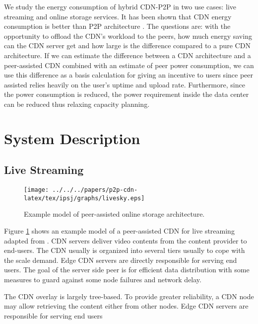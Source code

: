 We study the energy consumption of hybrid CDN-P2P in two use cases: live streaming and online storage services.  
It has been shown that CDN energy consumption is better than P2P architecture \cite{feldmann2010energy,baliga2007energy}. 
The questions are: with the opportunity to offload the CDN’s workload to the peers, how much energy saving can the CDN server get and how large is the difference compared to a pure CDN architecture.  
If we can estimate the difference between a CDN architecture and a peer-assisted CDN combined with an estimate of peer power consumption, we can use this difference as a basis calculation for giving an incentive to users since peer assisted relies heavily on the user’s uptime and upload rate. 
Furthermore, since the power consumption is reduced, the power requirement inside the data center can be reduced thus relaxing capacity planning. 

\section{System Description}\label{sec:system model}
\subsection{Live Streaming}

\begin{figure}[tb]
\begin{center}
\texttt{[image: ../../../papers/p2p-cdn-latex/tex/ipsj/graphs/livesky.eps]}
\end{center}
\caption{Example model of peer-assisted online storage architecture.}
\label{fig:iptv}
\end{figure} 

Figure \ref{fig:iptv} shows an example model of a peer-assisted CDN for live streaming adapted from \cite{Yin:2010:LEC:1823746.1823750}. 
CDN servers deliver video contents from the content provider to end-users. 
The CDN usually is organized into several tiers usually to cope with the scale demand. 
Edge CDN servers are directly responsible for serving end users. 
The goal of the server side peer is for efficient data distribution with some measures to guard against some node failures and network delay.

The CDN overlay is largely tree-based. 
To provide greater reliability, a CDN node may allow retrieving the content either from other nodes. 
Edge CDN servers are responsible for serving end users

